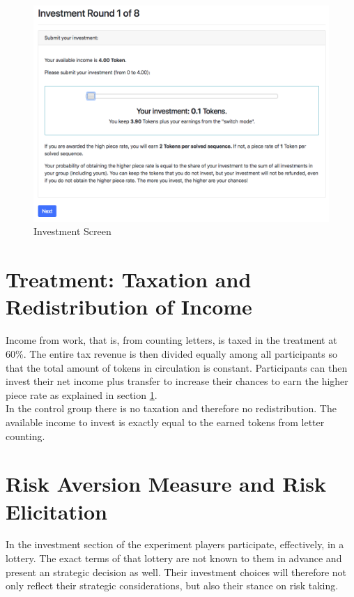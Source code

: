     \begin{figure}
        \centering
        \includegraphics[width=\textwidth]{graphs/screen_invest.png}
        \caption{Investment Screen}
        \label{fig:screen_invest}
    \end{figure}
    
    
    \section{Treatment: Taxation and Redistribution of Income}
    \label{ss:treat}
    
    Income from work, that is, from counting letters, is taxed in the treatment at 60\%. The entire tax revenue is then divided equally among all participants so that the total amount of tokens in circulation is constant. Participants can then invest their net income plus transfer to increase their chances to earn the higher piece rate as explained in section \ref{ss:treat}.\\
    
    In the control group there is no taxation and therefore no redistribution. The available income to invest is exactly equal to the earned tokens from letter counting.
    
    
    \section{Risk Aversion Measure and Risk Elicitation}
    
    In the investment section of the experiment players participate, effectively, in a lottery. The exact terms of that lottery are not known to them in advance and present an strategic decision as well. Their investment choices will therefore not only reflect their strategic considerations, but also their stance on risk taking.\\
    
